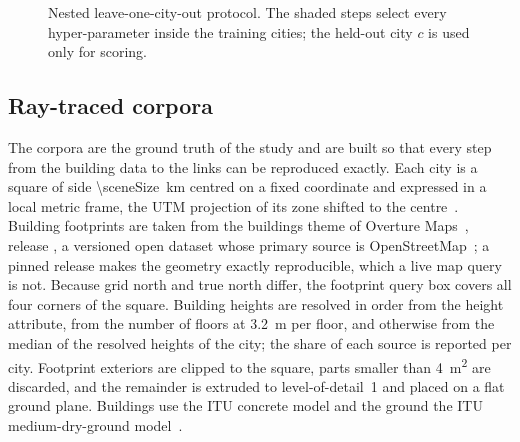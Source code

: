 \begin{figure}[!tp]
\centering
%
\caption{Nested leave-one-city-out protocol. The shaded steps
select every hyper-parameter inside the training cities; the held-out city
$c$ is used only for scoring.}
\label{fig:protocol}
\end{figure}

\subsection{Ray-traced corpora}
\label{sec:corpus}

The corpora are the ground truth of the study and are built so that every
step from the building data to the links can be reproduced exactly. Each
city is a square of side \SI{\sceneSize}{\kilo\metre} centred on a fixed
coordinate and expressed in a local metric frame, the UTM projection of its
zone shifted to the centre~\cite{snyder1987}. Building footprints are taken
from the buildings theme of Overture Maps~\cite{overture}, release
\overtureRelease{}, a versioned open dataset whose primary source is
OpenStreetMap~\cite{haklay2008osm}; a pinned release makes the geometry
exactly reproducible, which a live map query is not. Because grid north and
true north differ, the footprint query box covers all four corners of the
square. Building heights are resolved in order from the height attribute,
from the number of floors at \SI{3.2}{\metre} per floor, and otherwise from
the median of the resolved heights of the city; the share of each source is
reported per city. Footprint exteriors are clipped to the square, parts
smaller than \SI{4}{\metre\squared} are discarded, and the remainder is
extruded to level-of-detail~1 and placed on a flat ground plane. Buildings
use the ITU concrete model and the ground the ITU medium-dry-ground
model~\cite{itup2040}.

